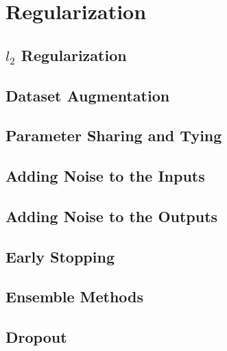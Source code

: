 \section{Regularization}

\subsection{\(l_2\) Regularization}


\subsection{Dataset Augmentation}

\subsection{Parameter Sharing and Tying}

\subsection{Adding Noise to the Inputs}

\subsection{Adding Noise to the Outputs}

\subsection{Early Stopping}

\subsection{Ensemble Methods}


\subsection{Dropout}